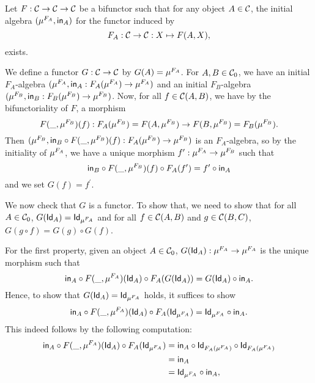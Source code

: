 \begin{solution}\label{sol:initialalg_for_bifunctor_functor}
	Let $F:\CC\to\CC\to\CC$ be a bifunctor such that for any object $A\in\CC$, the initial algebra $ (\Initalg{F_A}, \In_A) $ for the functor induced by 
	\[ F_A : \CC\to\CC : X \mapsto F(A,X), \]
	exists.
	
	We define a functor $ G: \CC \to \CC $ by $ G(A) = \Initalg{F_A} $. For $ A, B \in \Ob\CC $, we have an initial $ F_A $-algebra $ (\Initalg{F_A}, \In_A: F_A(\Initalg{F_A}) \to \Initalg{F_A}) $ and an initial $ F_B $-algebra $ (\Initalg{F_B}, \In_B: F_B(\Initalg{F_B}) \to \Initalg{F_B}) $. Now, for all $ f \in \CC(A, B) $, we have by the bifunctoriality of $ F $, a morphism
	\[ F(\_, \Initalg{F_B})(f): F_A(\Initalg{F_B}) = F(A, \Initalg{F_B}) \to F(B, \Initalg{F_B}) = F_B(\Initalg{F_B}). \]
	Then $ (\Initalg{F_B}, \In_B \circ F(\_, \Initalg{F_B})(f): F_A(\Initalg{F_B}) \to \Initalg{F_B}) $ is an $ F_A $-algebra, so by the initiality of $ \Initalg{F_A} $, we have a unique morphism $ f^\prime: \Initalg{F_A} \to \Initalg{F_B} $ such that 
	\[ \In_B \circ F(\_, \Initalg{F_B})(f) \circ F_A(f^\prime) = f^\prime \circ \In_A \]
	and we set $ G(f) = f^\prime $.
	
	We now check that $ G $ is a functor. To show that, we need to show that for all $ A \in \Ob \CC $, $ G(\Id[A]) = \Id[\Initalg{F_A}] $ and for all $ f \in \CC(A, B) $ and $ g \in \CC(B, C) $, $ G(g \circ f) = G(g) \circ G(f) $.

	For the first property, given an object $ A \in \Ob \CC $, $ G(\Id[A]): \Initalg{F_A} \to \Initalg{F_A} $ is the unique morphism such that
	\[ \In_A \circ F(\_, \Initalg{F_A})(\Id[A]) \circ F_A(G(\Id[A])) = G(\Id[A]) \circ \In_A. \]
	Hence, to show that $ G(\Id[A]) = \Id[\Initalg{F_A}] $ holds, it suffices to show 
	\[ \In_A \circ F(\_, \Initalg{F_A})(\Id[A]) \circ F_A(\Id[\Initalg{F_A}]) = \Id[\Initalg{F_A}] \circ \In_A. \]
	This indeed follows by the following computation:
	\begin{align*}
		\In_A \circ F(\_, \Initalg{F_A})(\Id[A]) \circ F_A(\Id[\Initalg{F_A}]) &= \In_A \circ \Id[F_A(\Initalg{F_A})] \circ \Id[F_A(\Initalg{F_A})]\\
		&= \In_A\\
		&= \Id[\Initalg{F_A}] \circ \In_A,
	\end{align*}


\end{solution}
